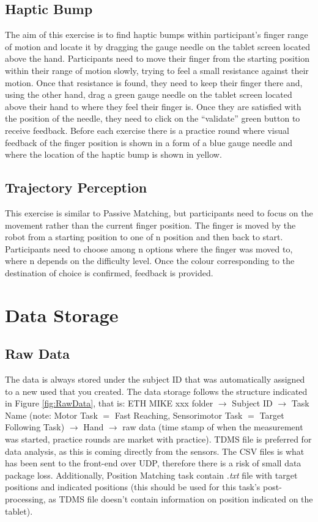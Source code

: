 \documentclass[10pt,oneside,a4paper]{article}
\begin{document}
\subsection{Haptic Bump}
The aim of this exercise is to find haptic bumps within participant’s finger range of motion and locate it by dragging the gauge needle on the tablet screen located above the hand. Participants need to move their finger from the starting position within their range of motion slowly, trying to feel a small resistance against their motion. Once that resistance is found, they need to keep their finger there and, using the other hand, drag a green gauge needle on the tablet screen located above their hand to where they feel their finger is. Once they are satisfied with the position of the needle, they need to click on the “validate” green button to receive feedback. Before each exercise there is a practice round where visual feedback of the finger position is shown in a form of a blue gauge needle and where the location of the haptic bump is shown in yellow.

\subsection{Trajectory Perception}
This exercise is similar to Passive Matching, but participants need to focus on the movement rather than the current finger position. The finger is moved by the robot from a starting position to one of n position and then back to start. Participants need to choose among n options where the finger was moved to, where n depends on the difficulty level. Once the colour corresponding to the destination of choice is confirmed, feedback is provided.

\newpage
\section{Data Storage}
\subsection{Raw Data}
The data is always stored under the subject ID that was automatically assigned to a new used that you created.
The data storage follows the structure indicated in Figure \ref{fig:RawData}, that is:
ETH MIKE xxx folder $\rightarrow$ Subject ID $\rightarrow$ Task Name (note: Motor Task $=$ Fast Reaching, Sensorimotor Task $=$ Target Following Task) $\rightarrow$ Hand $\rightarrow$ raw data (time stamp of when the measurement was started, practice rounds are market with practice).
TDMS file is preferred for data analysis, as this is coming directly from the sensors. The CSV files is what has been sent to the front-end over UDP, therefore there is a risk of small data package loss.
Additionally, Position Matching task contain \emph{.txt} file with target positions and indicated positions (this should be used for this task’s post-processing, as TDMS file doesn’t contain information on position indicated on the tablet).
\end{document}
